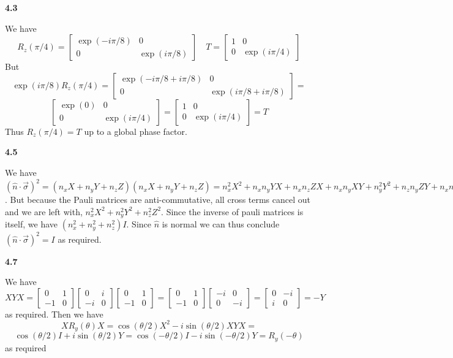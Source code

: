 \textbf{4.3}

We have \[R_z(\pi/4) = 
\begin{bmatrix}
    \exp(-i\pi/8) & 0 \\
    0 & \exp(i\pi/8)
\end{bmatrix}\quad T=\begin{bmatrix}
    1 & 0 \\ 
    0 & \exp(i\pi/4)
\end{bmatrix}\]
But 
\[\exp(i\pi/8)R_z(\pi/4) = \begin{bmatrix}
    \exp(-i\pi/8 +i\pi/8 ) & 0 \\
    0 & \exp(i\pi/8 + i\pi/8)
\end{bmatrix} = \]\[  \begin{bmatrix}
    \exp(0) & 0 \\
    0 & \exp(i\pi/4)
\end{bmatrix} =   \begin{bmatrix}
    1 & 0 \\
    0 & \exp(i\pi/4)
\end{bmatrix}  = T\]
Thus $R_z(\pi/4)  = T$ up to a global phase factor.

\textbf{4.5}

We have $(\hat{n}\cdot\vec{\sigma})^2 = (n_xX+n_yY+n_zZ)(n_xX+n_yY+n_zZ) = n_x^2X^2 + n_xn_yYX + n_xn_z ZX + n_xn_yXY + n_y^2Y^2 + n_zn_y ZY + n_xn_z XZ + n_yn_z YZ + n_z^2 Z^2$. But because the Pauli matrices are anti-commutative, all cross terms cancel out and we are left with, $n_x^2X^2 + n_y^2 Y^2 + n_z^2 Z^2$. Since the inverse of pauli matrices is itself, we have $ (n_x^2+n_y^2 + n_z^2)I$. Since $\hat{n}$ is normal we can thus conclude $(\hat{n}\cdot\vec{\sigma})^2 = I$ as required.

\textbf{4.7}

We have \[XYX =\begin{bmatrix}
    0 & 1\\
    -1 & 0
\end{bmatrix}\begin{bmatrix}
    0 & i\\
    -i & 0
\end{bmatrix}\begin{bmatrix}
    0 & 1\\
    -1 & 0
\end{bmatrix} = \begin{bmatrix}
    0 & 1\\
    -1 & 0
\end{bmatrix}\begin{bmatrix}
    -i & 0\\
    0 & -i
\end{bmatrix} = \begin{bmatrix}
    0 & -i\\
    i & 0
\end{bmatrix} = -Y\]
as required. Then we have \[XR_y(\theta)X = \cos(\theta/2)X^2 -i\sin(\theta/2) XYX =\]\[\cos(\theta/2)I +i\sin(\theta/2)Y =\cos(-\theta/2)I -i\sin(-\theta/2)Y  = R_y(-\theta)\]
as required

